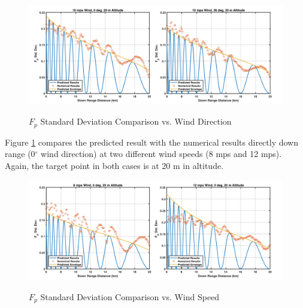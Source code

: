 \begin{figure}[H]
  \begin{center}
\includegraphics[width=6in]{../media/statistics/predicted_results_wind_direction.png}
  \end{center}
  \renewcommand{\baselinestretch}{1} \small\normalsize
  \begin{quote}
    \caption[$F_p$ Standard Deviation Comparison vs. Wind Direction]{$F_p$ Standard Deviation Comparison vs. Wind Direction\label{stat_fig:a1}}
  \end{quote}
\end{figure}
\renewcommand{\baselinestretch}{2} \small\normalsize

Figure \ref{stat_fig:a1} compares the predicted result with the numerical results directly down range (0$^{\circ}$ wind direction) at two different wind speeds (8 mps and 12 mps). Again, the target point in both cases is at 20 m in altitude.

\begin{figure}[H]
  \begin{center}
\includegraphics[width=6in]{../media/statistics/predicted_results_wind_speed.png}
  \end{center}
  \renewcommand{\baselinestretch}{1} \small\normalsize
  \begin{quote}
    \caption[$F_p$ Standard Deviation Comparison vs. Wind Speed]{$F_p$ Standard Deviation Comparison vs. Wind Speed\label{stat_fig:a2}}
  \end{quote}
\end{figure}
\renewcommand{\baselinestretch}{2} \small\normalsize

